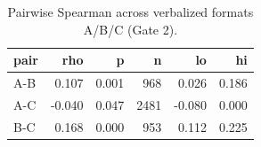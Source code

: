 \begin{table}
\caption{Pairwise Spearman across verbalized formats A/B/C (Gate 2).}
\label{tab:t5_h0_format_agreement}
\begin{tabular}{lrrrrr}
\toprule
pair & rho & p & n & lo & hi \\
\midrule
A-B & 0.107 & 0.001 & 968 & 0.026 & 0.186 \\
A-C & -0.040 & 0.047 & 2481 & -0.080 & 0.000 \\
B-C & 0.168 & 0.000 & 953 & 0.112 & 0.225 \\
\bottomrule
\end{tabular}
\end{table}
